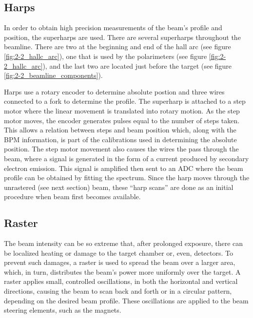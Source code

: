 \documentclass[
]{report}
\begin{document}


\hypertarget{harps}{%
\subsection{Harps}\label{harps}}

In order to obtain high precision measurements of the beam's profile and
position, the superharps are used. There are several superharps
throughout the beamline. There are two at the beginning and end of the
hall arc (see figure \ref{fig:2-2_hallc_arc}), one that is used by the
polarimeters (see figure \ref{fig:2-2_hallc_arc}), and the last two are
located just before the target (see figure
\ref{fig:2-2_beamline_components}).

Harps use a rotary encoder to determine absolute postion and three wires
connected to a fork to determine the profile. The superharp is attached
to a step motor where the linear movement is translated into rotary
motion. As the step motor moves, the encoder generates pulses equal to
the number of steps taken. This allows a relation between steps and beam
position which, along with the BPM information, is part of the
calibrations used in determining the absolute position. The step motor
movement also causes the wires the pass through the beam, where a signal
is generated in the form of a current produced by secondary electron
emission. This signal is amplified then sent to an ADC where the beam
profile can be obtained by fitting the spectrum. Since the harp moves
through the unrastered (see next section) beam, these ``harp scans'' are
done as an initial procedure when beam first becomes available.

\hypertarget{raster}{%
\subsection{Raster}\label{raster}}

The beam intensity can be so extreme that, after prolonged exposure,
there can be localized heating or damage to the target chamber or, even,
detectors. To prevent such damages, a raster is used to spread the beam
over a larger area, which, in turn, distributes the beam's power more
uniformly over the target. A raster applies small, controlled
oscillations, in both the horizontal and vertical directions, causing
the beam to scan back and forth or in a circular pattern, depending on
the desired beam profile. These oscillations are applied to the beam
steering elements, such as the magnets.
\end{document}
